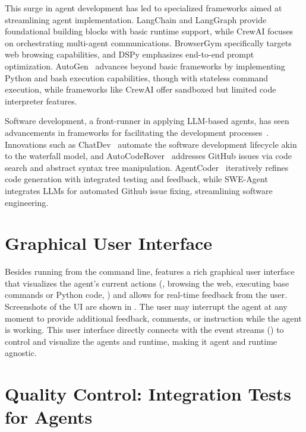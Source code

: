 This surge in agent development has led to specialized frameworks aimed at streamlining agent implementation. LangChain and LangGraph \cite{langchain2022} provide foundational building blocks with basic runtime support, while CrewAI \cite{crewai2024} focuses on orchestrating multi-agent communications. BrowserGym \cite{browsergym} specifically targets web browsing capabilities, and DSPy \cite{khattab2024dspy} emphasizes end-to-end prompt optimization. AutoGen~\cite{wu2023autogen} advances beyond basic frameworks by implementing Python and bash execution capabilities, though with stateless command execution, while frameworks like CrewAI offer sandboxed but limited code interpreter features.

Software development, a front-runner in applying LLM-based agents, has seen advancements in frameworks for facilitating the development processes~\cite{hong2023metagpt,qian2023communicative}. Innovations such as ChatDev~\cite{qian2023communicative} automate the software development lifecycle akin to the waterfall model, and AutoCodeRover~\cite{zhang2024autocoderover} addresses GitHub issues via code search and abstract syntax tree manipulation. AgentCoder~\cite{huang2024agentcoder} iteratively refines code generation with integrated testing and feedback, while SWE-Agent~\cite{yang2024sweagent} integrates LLMs for automated Github issue fixing, streamlining software engineering.


\section{Graphical User Interface}
\label{sec:ui}

Besides running from the command line, \projname features a rich graphical user interface that visualizes the agent's current actions (\eg, browsing the web, executing base commands or Python code, \etc) and allows for real-time feedback from the user.
Screenshots of the UI are shown in .
The user may interrupt the agent at any moment to provide additional feedback, comments, or instruction while the agent is working.
This user interface directly connects with the event streams () to control and visualize the agents and runtime, making it agent and runtime agnostic.


\section{Quality Control: Integration Tests for Agents}
\label{sec:integration-tests}

